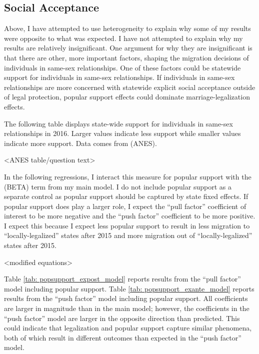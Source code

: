 \documentclass[12pt,letterpaper]{article}
\begin{document}
\clearpage
\subsection{Social Acceptance}

Above, I have attempted to use heterogeneity to explain why some of my results were opposite to what was expected. I have not attempted to explain why my results are relatively insignificant. One argument for why they are insignificant is that there are other, more important factors, shaping the migration decisions of individuals in same-sex relationships. One of these factors could be statewide support for individuals in same-sex relationships. If individuals in same-sex relationships are more concerned with statewide explicit social acceptance outside of legal protection, popular support effects could dominate marriage-legalization effects.

The following table displays state-wide support for individuals in same-sex relationships in 2016. Larger values indicate less support while smaller values indicate more support. Data comes from (ANES).

<ANES table/question text>

In the following regressions, I interact this measure for popular support with the (BETA) term from my main model. I do not include popular support as a separate control as popular support should be captured by state fixed effects. If popular support does play a larger role, I expect the “pull factor” coefficient of interest to be more negative and the “push factor” coefficient to be more positive. I expect this because I expect less popular support to result in less migration to “locally-legalized” states after 2015 and more migration out of “locally-legalized” states after 2015. 

<modified equations>

Table \ref{tab: popsupport_expost_model} reports results from the “pull factor” model including popular support. Table \ref{tab: popsupport_exante_model} reports results from the “push factor” model including popular support. All coefficients are larger in magnitude than in the main model; however, the coefficients in the “push factor” model are larger in the opposite direction than predicted. This could indicate that legalization and popular support capture similar phenomena, both of which result in different outcomes than expected in the “push factor” model.

\begin{table}[h] %
    \centering
    
    \caption{}
    \label{tab: popsupport_expost_model}
\end{table}
\begin{table}[h]
    \centering
    
    \caption{}
    \label{tab: popsupport_exante_model}
\end{table}
\end{document}
